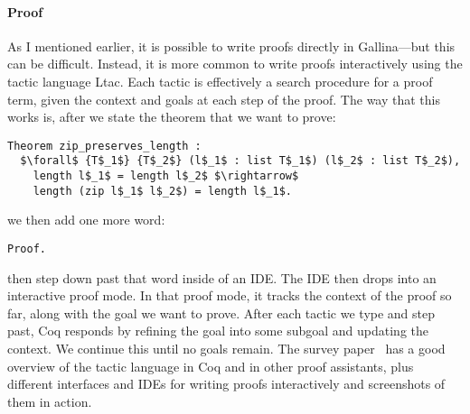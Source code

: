 \paragraph{Proof} As I mentioned earlier, it is possible to write proofs directly in Gallina---but this can be difficult.
Instead, it is more common to write proofs interactively using the tactic language Ltac.
Each tactic is effectively a search procedure for a proof term, given the context and goals at each step of the proof.
The way that this works is, after we state the theorem that we want to prove:

\begin{lstlisting}
Theorem zip_preserves_length :
  $\forall$ {T$_1$} {T$_2$} (l$_1$ : list T$_1$) (l$_2$ : list T$_2$),
    length l$_1$ = length l$_2$ $\rightarrow$
    length (zip l$_1$ l$_2$) = length l$_1$.
\end{lstlisting}
we then add one more word:

\begin{lstlisting}
Proof.
\end{lstlisting}
then step down past that word inside of an IDE. %
The IDE then drops into an interactive proof mode.
In that proof mode, it tracks the context of the proof so far, along with the goal we want to prove.
After each tactic we type and step past, Coq responds by refining the goal into some subgoal
and updating the context.
We continue this until no goals remain.
The survey paper~\cite{PGL-045} has a good overview of the tactic language in Coq and in other proof assistants,
plus different interfaces and IDEs for writing proofs interactively and screenshots of them in action.

